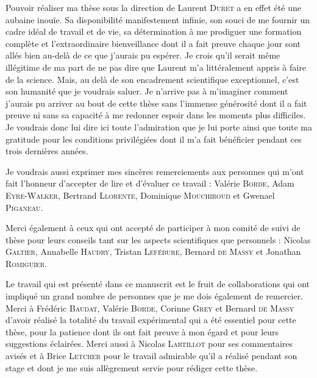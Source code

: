 Pouvoir réaliser ma thèse sous la direction de Laurent \textsc{Duret} a en effet été une aubaine inouïe.
Sa disponibilité manifestement infinie, son souci de me fournir un cadre idéal de travail et de vie, sa détermination à me prodiguer une formation complète et l'extraordinaire bienveillance dont il a fait preuve chaque jour sont allés bien au-delà de ce que j'aurais pu espérer.
Je crois qu'il serait même illégitime de ma part de ne pas dire que Laurent m'a littéralement appris à faire de la science.
Mais, au delà de son encadrement scientifique exceptionnel, c'est son humanité que je voudrais saluer.
Je n'arrive pas à m'imaginer comment j'aurais pu arriver au bout de cette thèse sans l'immense générosité dont il a fait preuve ni sans sa capacité à me redonner espoir dans les moments plus difficiles.
Je voudrais donc lui dire ici toute l'admiration que je lui porte ainsi que toute ma gratitude pour les conditions privilégiées dont il m'a fait bénéficier pendant ces trois dernières années.

Je voudrais aussi exprimer mes sincères remerciements aux personnes qui m'ont fait l'honneur d'accepter de lire et d'évaluer ce travail : Valérie \textsc{Borde}, Adam \textsc{Eyre-Walker}, Bertrand \textsc{Llorente}, Dominique \textsc{Mouchiroud} et Gwenael \textsc{Piganeau}.

Merci également à ceux qui ont accepté de participer à mon comité de suivi de thèse pour leurs conseils tant sur les aspects scientifiques que personnels : 
Nicolas \textsc{Galtier},
Annabelle \textsc{Haudry},
Tristan \textsc{Lefébure},
Bernard \textsc{de Massy} et
Jonathan \textsc{Romiguier}.


Le travail qui est présenté dans ce manuscrit est le fruit de collaborations qui ont impliqué un grand nombre de personnes que je me dois également de remercier.
Merci à Frédéric \textsc{Baudat}, Valérie \textsc{Borde}, Corinne \textsc{Grey} et Bernard \textsc{de Massy} d'avoir réalisé la totalité du travail expérimental qui a été essentiel pour cette thèse, pour la patience dont ils ont fait preuve à mon égard et pour leurs suggestions éclairées.
Merci aussi à Nicolas \textsc{Lartillot} pour ses commentaires avisés et à Brice \textsc{Letcher} pour le travail admirable qu'il a réalisé pendant son stage et dont je me suis allègrement servie pour rédiger cette thèse.\\



